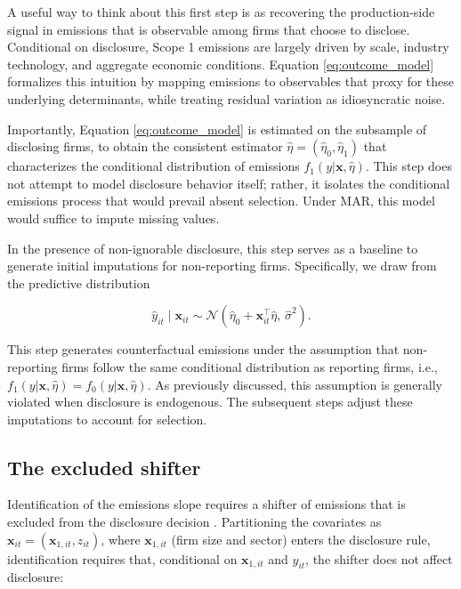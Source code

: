 \documentclass[a4paper,12pt]{article}
\newcommand{\citep}[1]{\parencite{#1}}
\begin{document}
A useful way to think about this first step is as recovering the production-side signal in emissions that is observable among firms that choose to disclose. Conditional on disclosure, Scope 1 emissions are largely driven by scale, industry technology, and aggregate economic conditions. Equation \eqref{eq:outcome_model} formalizes this intuition by mapping emissions to observables that proxy for these underlying determinants, while treating residual variation as idiosyncratic noise. 

Importantly, Equation \eqref{eq:outcome_model} is estimated on the subsample of disclosing firms, to obtain the consistent estimator $\hat{\eta} = (\hat{\eta}_0, \hat{\eta}_1)$ that characterizes the conditional distribution of emissions $f_1(y|\mathbf{x}, \hat{\eta})$. This step does not attempt to model disclosure behavior itself; rather, it isolates the conditional emissions process that would prevail absent selection. Under MAR, this model would suffice to impute missing values. 

In the presence of non-ignorable disclosure, this step serves as a baseline to generate initial imputations for non-reporting firms. Specifically, we draw from the predictive distribution 

\begin{equation}
\label{eq:baseline_imputation}
\hat{y}_{it} \mid \mathbf{x}_{it} \sim \mathcal{N}\!\left(\hat\eta_0 + \mathbf{x}_{it}^\top \hat\eta, \, \hat\sigma^2 \right).
\end{equation}

This step generates counterfactual emissions under the assumption that non-reporting firms follow the same conditional distribution as reporting firms, i.e., $f_1(y|\mathbf{x}, \hat{\eta})=f_0(y|\mathbf{x}, \hat{\eta})$. As previously discussed, this assumption is generally violated when disclosure is endogenous. The subsequent steps adjust these imputations to account for selection.

\subsection{The excluded shifter}
\label{app:instrument}

Identification of the emissions slope requires a shifter of emissions that is excluded from the disclosure decision \citep{wang2014instrumental}. Partitioning the covariates as $\mathbf{x}_{it} = (\mathbf{x}_{1,it}, z_{it})$, where $\mathbf{x}_{1,it}$ (firm size and sector) enters the disclosure rule, identification requires that, conditional on $\mathbf{x}_{1,it}$ and $y_{it}$, the shifter does not affect disclosure:
\end{document}
